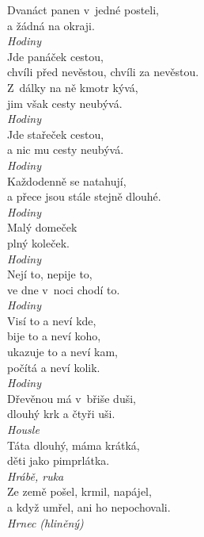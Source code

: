 \begin{multicols}{3}
\noindent
Dvanáct panen v~jedné posteli,\\
a žádná na okraji.\\[1 mm]
{\sl Hodiny}\\

\noindent
Jde panáček cestou,\\
chvíli před nevěstou, chvíli za nevěstou.\\
Z~dálky na ně kmotr kývá,\\
jim však cesty neubývá.\\[1 mm]
{\sl Hodiny}\\

\noindent
Jde stařeček cestou,\\
a nic mu cesty neubývá.\\[1 mm]
{\sl Hodiny}\\

\noindent
Každodenně se natahují,\\
a přece jsou stále stejně dlouhé.\\[1 mm]
{\sl Hodiny}\\

\noindent
Malý domeček\\
plný koleček.\\[1 mm]
{\sl Hodiny}\\

\noindent
Nejí to, nepije to,\\
ve dne v~noci chodí to.\\[1 mm]
{\sl Hodiny}\\

\noindent
Visí to a neví kde,\\
bije to a neví koho,\\
ukazuje to a neví kam,\\
počítá a neví kolik.\\[1 mm]
{\sl Hodiny}\\

\noindent
Dřevěnou má v~břiše duši,\\
dlouhý krk a čtyři uši.\\[1 mm]
{\sl Housle}\\

\noindent
Táta dlouhý, máma krátká,\\
děti jako pimprlátka.\\[1 mm]
{\sl Hrábě, ruka}\\

\noindent
Ze země pošel, krmil, napájel,\\
a když umřel, ani ho nepochovali.\\[1 mm]
{\sl Hrnec (hliněný)}\\


\end{multicols}
